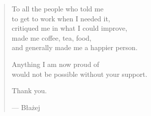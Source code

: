 \newenvironment{dedication}{
  \clearpage
  \thispagestyle{empty}
  \vspace*{\stretch{1}}
  \itshape
  \raggedright
  \begin{quote}
    }{
  \end{quote}
  \par
  \vspace{\stretch{3}}
  \clearpage
}

\begin{dedication}
  To all the people who told me\\
  to get to work when I needed it,\\
  critiqued me in what I could improve,\\
  made me coffee, tea, food,\\
  and generally made me a happier person.

  \vspace*{\baselineskip}
  Anything I am now proud of\\
  would not be possible without your support.

  \vspace*{\baselineskip}
  Thank you.

  \vspace*{\baselineskip}
  --- Błażej
\end{dedication}
